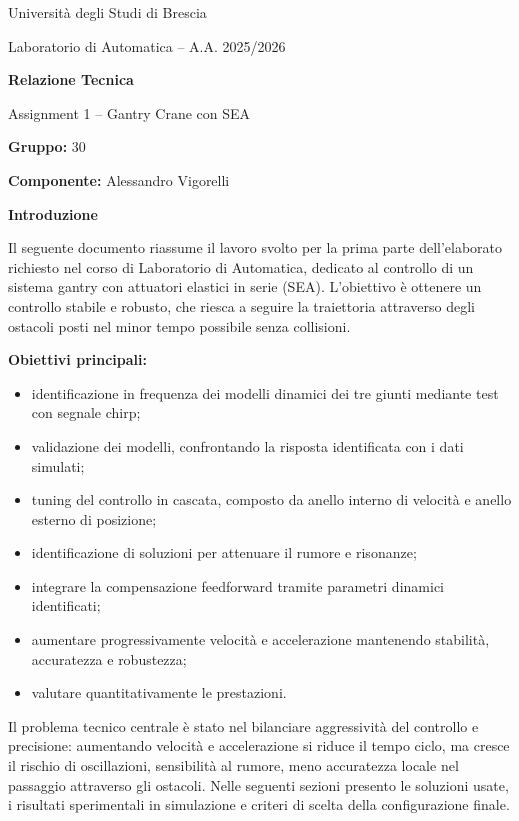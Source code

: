 \documentclass{article}
\begin{document}
\begin{titlepage}
    \centering
    {\large Università degli Studi di Brescia\par}
    {\normalsize Laboratorio di Automatica -- A.A. 2025/2026\par}
    \vspace{1.2cm}

    {\LARGE \textbf{Relazione Tecnica}\par}
    \vspace{0.2cm}
    {\Large Assignment 1 -- Gantry Crane con SEA\par}
    \vspace{1cm}

    {\normalsize \textbf{Gruppo:} 30\par}
    {\normalsize \textbf{Componente:} Alessandro Vigorelli\par}

    \vspace{1.2cm}
    {\normalsize \textbf{Introduzione}\par}
Il seguente documento riassume il lavoro svolto per la prima parte dell'elaborato richiesto nel corso di Laboratorio di Automatica,
dedicato al controllo di un sistema gantry con attuatori elastici in serie (SEA). 
L'obiettivo è ottenere un controllo stabile e robusto, che riesca a seguire la traiettoria attraverso degli ostacoli posti nel minor tempo 
possibile senza collisioni.

\textbf{Obiettivi principali:}
\begin{itemize}
    \item identificazione in frequenza dei modelli dinamici dei tre giunti mediante test con segnale chirp;
    \item validazione dei modelli, confrontando la risposta identificata con i dati simulati;
    \item tuning del controllo in cascata, composto da anello interno di velocità e anello esterno di posizione;
    \item identificazione di soluzioni per attenuare il rumore e risonanze;
    \item integrare la compensazione feedforward tramite parametri dinamici identificati;
    \item aumentare progressivamente velocità e accelerazione mantenendo stabilità,
    accuratezza e robustezza;
    \item valutare quantitativamente le prestazioni.
\end{itemize}

Il problema tecnico centrale è stato nel bilanciare aggressività del controllo e precisione: aumentando velocità e accelerazione
 si riduce il tempo ciclo, ma cresce il rischio di oscillazioni, 
sensibilità al rumore, meno accuratezza locale nel passaggio attraverso gli ostacoli. 
Nelle seguenti sezioni presento le soluzioni usate, i risultati sperimentali in simulazione 
e criteri di scelta della configurazione finale.
\end{titlepage}
\end{document}
